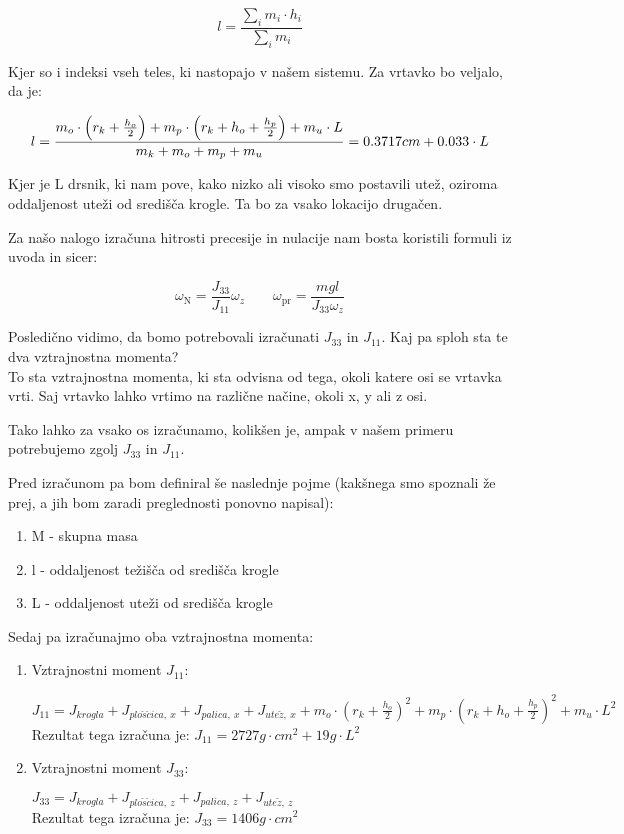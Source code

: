 \documentclass[11pt, a4paper]{article}
\theoremstyle{definition}
\theoremstyle{example}
\theoremstyle{izrek}
\begin{document}
$$l = \frac{\sum_{i}m_i\cdot h_i}{\sum_{i}m_i}$$

Kjer so i indeksi vseh teles, ki nastopajo v našem sistemu. Za vrtavko bo veljalo, da je: 

	$$l =  \frac{m_o\cdot \left(r_k + \frac{h_o}{2}\right) + m_p\cdot \left(r_k + h_o + \frac{h_p}{2}\right) + m_u\cdot L}{m_k + m_o + m_p + m_u}\\
	=  0.3717cm + 0.033\cdot L$$

Kjer je L drsnik, ki nam pove, kako nizko ali visoko smo postavili utež, oziroma oddaljenost uteži od središča krogle. Ta bo za vsako lokacijo drugačen. 

\pagebreak
Za našo nalogo izračuna hitrosti precesije in nulacije nam bosta koristili formuli iz uvoda in sicer: 

$$
\omega_{\mathrm{N}}=\frac{J_{33}}{J_{11}} \omega_{z} \qquad \omega_{\mathrm{pr}}=\frac{m g l}{J_{33} \omega_{z}}
$$

Posledično vidimo, da bomo potrebovali izračunati $J_{33}$ in $J_{11}$. Kaj pa sploh sta te dva vztrajnostna momenta?\\
To sta vztrajnostna momenta, ki sta odvisna od tega, okoli katere osi se vrtavka vrti. Saj vrtavko lahko vrtimo na različne načine, okoli x, y ali z osi. \\
\medskip

Tako lahko za vsako os izračunamo, kolikšen je, ampak v našem primeru potrebujemo zgolj $J_{33}$ in $J_{11}$.

Pred izračunom pa bom definiral še naslednje pojme (kakšnega smo spoznali že prej, a jih bom zaradi preglednosti ponovno napisal):
\begin{enumerate}
\item M - skupna masa
\item l - oddaljenost težišča od središča krogle
\item L - oddaljenost uteži od središča krogle
\end{enumerate}

Sedaj pa izračunajmo oba vztrajnostna momenta:
\begin{enumerate}

\item Vztrajnostni moment $J_{11}$: 
\begin{center}
	$J_{11} =  J_{krogla} + J_{plo\check{s}\check{c}ica,\: x} + J_{palica,\: x} + J_{ute\check{z},\: x} + m_o\cdot \left(r_k+\frac{h_o}{2}\right)^2 + m_p\cdot \left(r_k + h_o + \frac{h_p}{2}\right)^2 + m_u\cdot L^2$ \\
	\medskip
	Rezultat tega izračuna je: \underline{$J_{11}=2727g\cdot cm^2 + 19g\cdot L^2$}
\end{center}

\item Vztrajnostni moment $J_{33}$:
\begin{center}
$J_{33} = J_{krogla} + J_{plo\check{s}\check{c}ica,\: z} + J_{palica,\: z} + J_{ute\check{z},\: z}$\\
\medskip
Rezultat tega izračuna je: \underline{$J_{33}=1406 g\cdot cm^2$}
\end{center}
\end{enumerate}
\end{document}
